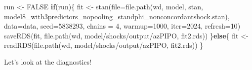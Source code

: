 \documentclass[
  letterpaper,
  DIV=11,
  numbers=noendperiod]{scrartcl}
\newenvironment{Shaded}{\begin{snugshade}}{\end{snugshade}}
\newcommand{\AttributeTok}[1]{\textcolor[rgb]{0.40,0.45,0.13}{#1}}
\newcommand{\ConstantTok}[1]{\textcolor[rgb]{0.56,0.35,0.01}{#1}}
\newcommand{\ControlFlowTok}[1]{\textcolor[rgb]{0.00,0.23,0.31}{\textbf{#1}}}
\newcommand{\DecValTok}[1]{\textcolor[rgb]{0.68,0.00,0.00}{#1}}
\newcommand{\FunctionTok}[1]{\textcolor[rgb]{0.28,0.35,0.67}{#1}}
\newcommand{\NormalTok}[1]{\textcolor[rgb]{0.00,0.23,0.31}{#1}}
\newcommand{\OtherTok}[1]{\textcolor[rgb]{0.00,0.23,0.31}{#1}}
\newcommand{\SpecialCharTok}[1]{\textcolor[rgb]{0.37,0.37,0.37}{#1}}
\newcommand{\StringTok}[1]{\textcolor[rgb]{0.13,0.47,0.30}{#1}}
\begin{document}
\begin{Shaded}
\begin{Highlighting}[]
\NormalTok{run }\OtherTok{\textless{}{-}} \ConstantTok{FALSE}
\ControlFlowTok{if}\NormalTok{(run)\{}
\NormalTok{  fit }\OtherTok{\textless{}{-}} \FunctionTok{stan}\NormalTok{(}\AttributeTok{file=}\FunctionTok{file.path}\NormalTok{(wd, }\StringTok{\textquotesingle{}model\textquotesingle{}}\NormalTok{, }\StringTok{\textquotesingle{}stan\textquotesingle{}}\NormalTok{, }
                             \StringTok{\textquotesingle{}model8\_with3predictors\_nopooling\_standphi\_nonconcordantshock.stan\textquotesingle{}}\NormalTok{),}
            \AttributeTok{data=}\NormalTok{data, }\AttributeTok{seed=}\DecValTok{5838293}\NormalTok{,}
            \AttributeTok{chains =} \DecValTok{4}\NormalTok{,}
            \AttributeTok{warmup=}\DecValTok{1000}\NormalTok{, }\AttributeTok{iter=}\DecValTok{2024}\NormalTok{, }\AttributeTok{refresh=}\DecValTok{10}\NormalTok{)}
  \FunctionTok{saveRDS}\NormalTok{(fit, }\FunctionTok{file.path}\NormalTok{(wd, }\StringTok{\textquotesingle{}model/shocks/output/azPIPO\textquotesingle{}}\NormalTok{, }\StringTok{\textquotesingle{}fit2.rds\textquotesingle{}}\NormalTok{))}
\NormalTok{\}}\ControlFlowTok{else}\NormalTok{\{}
\NormalTok{  fit }\OtherTok{\textless{}{-}} \FunctionTok{readRDS}\NormalTok{(}\FunctionTok{file.path}\NormalTok{(wd, }\StringTok{\textquotesingle{}model/shocks/output/azPIPO\textquotesingle{}}\NormalTok{, }\StringTok{\textquotesingle{}fit2.rds\textquotesingle{}}\NormalTok{))}
\NormalTok{\}}
\end{Highlighting}
\end{Shaded}

\linespread{2}

Let's look at the diagnostics!

\linespread{0.5}

\begin{Shaded}
\end{Shaded}
\end{document}
